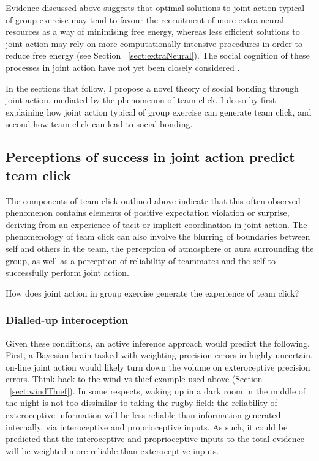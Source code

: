\begin{CJK}{UTF8}{gbsn}
Evidence discussed above suggests that optimal solutions to joint action typical of group exercise may tend to favour the recruitment of more extra-neural resources as a way of minimising free energy, whereas less efficient solutions to joint action may rely on more computationally intensive procedures in order to reduce free energy (see Section ~\ref{sect:extraNeural}).  The social cognition of these processes in joint action have not yet been closely considered \citep[but see ][]{Marsh2009,Lumsden2012}.


In the sections that follow, I propose a novel theory of social bonding through joint action, mediated by the phenomenon of team click. I do so by first explaining how joint action typical of group exercise can generate team click, and second how team click can lead to social bonding.

\subsection{Perceptions of success in joint action predict team click\label{sect:JASuccessTeamClick}}

The components of team click outlined above indicate that this often observed phenomenon contains elements of positive expectation violation or surprise, deriving from an experience of tacit or implicit coordination in joint action.  The phenomenology of team click can also involve the blurring of boundaries between self and others in the team, the perception of atmosphere or aura surrounding the group, as well as a perception of reliability of teammates and the self to successfully perform joint action.

How does joint action in group exercise generate the experience of team click?

\subsubsection{Dialled-up interoception}
Given these conditions, an active inference approach would predict the following.  First, a Bayesian brain tasked with weighting precision errors in highly uncertain, on-line joint action would likely turn down the volume on exteroceptive precision errors.  Think back to the wind vs thief example used above (Section ~\ref{sect:windThief}). In some respects, waking up in a dark room in the middle of the night is not too dissimilar to taking the rugby field: the reliability of exteroceptive information will be less reliable than information generated internally, via interoceptive and proprioceptive inputs. As such, it could be predicted that the interoceptive and proprioceptive inputs to the total evidence will be weighted more reliable than exteroceptive inputs.


\end{CJK}
